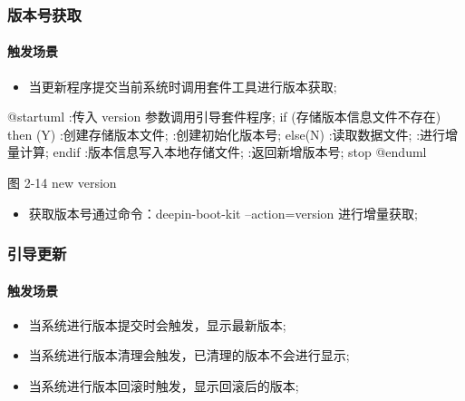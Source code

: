 \documentclass{utart}
\begin{document}
\subsubsection{版本号获取}
\paragraph{触发场景}
\begin{itemize}[leftmargin=4em]
  \item 当更新程序提交当前系统时调用套件工具进行版本获取;
\end{itemize}

\begin{center}
  \begin{adjustbox}{scale=0.75}
    \begin{plantuml}
      @startuml
      :传入 version 参数调用引导套件程序;
      if (存储版本信息文件不存在) then (Y)
      :创建存储版本文件;
      :创建初始化版本号;
      else(N)
      :读取数据文件;
      :进行增量计算;
      endif
      :版本信息写入本地存储文件;
      :返回新增版本号;
      stop
      @enduml
    \end{plantuml}
  \end{adjustbox}

  图 2-14 new version
\end{center}
\begin{itemize}[leftmargin=4em]
  \item 获取版本号通过命令：deepin-boot-kit --action=version 进行增量获取;
\end{itemize}

\subsubsection{引导更新}
\paragraph{触发场景}
\begin{itemize}[leftmargin=4em]
  \item 当系统进行版本提交时会触发，显示最新版本;
  \item 当系统进行版本清理会触发，已清理的版本不会进行显示;
  \item 当系统进行版本回滚时触发，显示回滚后的版本;
\end{itemize}
\end{document}
